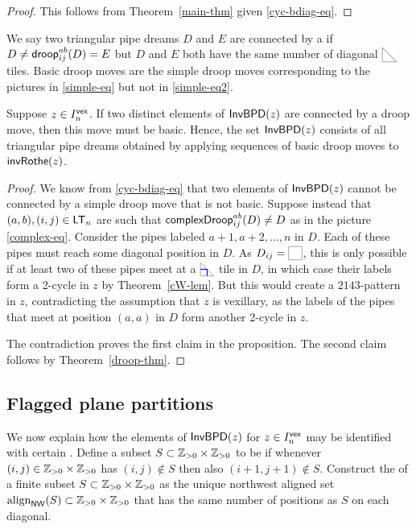 \documentclass[10pt]{article}
\begin{document}
\begin{proof}
This follows from Theorem~\ref{main-thm} given \eqref{cyc-bdiag-eq}.
\end{proof}

We say   two triangular pipe dreams $D$ and $E$ are connected by a
 if $D\neq \mathsf{droop}^{ab}_{ij}(D) = E$
but $D$ and $E$ both have the same number of diagonal $\BDIAG$ tiles.
Basic droop moves are the simple droop moves corresponding to the pictures in  \eqref{simple-eq} but not in \eqref{simple-eq2}.


 
\begin{proposition}\label{bbs-prop}
Suppose $z \in I^{\mathsf{vex}}_n $.
If two distinct elements of $ \mathsf{InvBPD}(z)$ are connected by a droop move, then this move must be basic.
Hence, the set $ \mathsf{InvBPD}(z)$ consists of all triangular pipe dreams obtained by applying sequences of basic droop moves to $\mathsf{invRothe}(z)$.
\end{proposition}

\begin{proof}
We know from \eqref{cyc-bdiag-eq} that 
two elements of $ \mathsf{InvBPD}(z)$ cannot be connected by a simple droop move that is not basic. 
Suppose instead that $(a,b),(i,j) \in \mathsf{LT}_n$ are such that $\mathsf{complexDroop}^{ab}_{ij}(D) \neq D$ as in the picture \eqref{complex-eq}.
Consider the pipes labeled $a+1,a+2,\dots,n$ in $D$.
  Each of these pipes must reach some diagonal position in $D$.
  As $D_{ij}=\BTILE$, this is only possible if at least two of  these pipes meet 
at a $\PDIAG$ tile in $D$, in which case their labels form a 2-cycle in $z$ by Theorem~\ref{cW-lem}.
But this would create a $2143$-pattern in $z$, contradicting
  the assumption that $z$ is vexillary,
  as the labels of the pipes that meet at position $(a,a)$ in $D$ form another 2-cycle in $z$.

The contradiction proves the first claim in the proposition.
The second claim follows by Theorem~\ref{droop-thm}.
\end{proof}
 
 
\subsection{Flagged plane partitions}\label{flagged-sect}


We now explain how the elements of $\mathsf{InvBPD}(z)$ for $z\in I^{\mathsf{vex}}_n$ 
may be identified with certain .
Define a subset $S \subset \mathbb{Z}_{>0}\times \mathbb{Z}_{>0}$ to be  if whenever $(i,j) \in \mathbb{Z}_{>0}\times \mathbb{Z}_{>0}$ has $(i,j) \notin S$ then also
$(i+1,j+1) \notin S$. 
Construct the  of a finite subset $S \subset \mathbb{Z}_{>0}\times \mathbb{Z}_{>0}$ 
as the unique northwest aligned set $\mathrm{align}_{\mathsf{NW}}(S) \subset \mathbb{Z}_{>0}\times \mathbb{Z}_{>0}$ that has
the same number of positions as $S$ on each diagonal.
\end{document}
